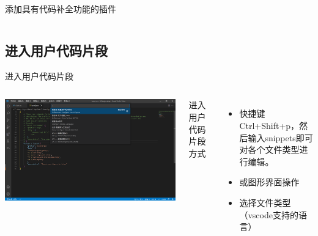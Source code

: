 \documentclass{beamer}
\begin{document}
\begin{frame}{添加具有代码补全功能的插件}
\begin{columns}
    \end{columns}
\end{frame}

\subsection{进入用户代码片段}
\begin{frame}{进入用户代码片段}
    \begin{columns}
        \begin{minipage}[c][\textheight][c]{\linewidth}
            \centering
            \includegraphics[scale=0.08]{pic/open.png}
        \end{minipage}
        进入用户代码片段方式
        \begin{itemize}
            \item 快捷键Ctrl+Shift+p，然后输入snippets即可对各个文件类型进行编辑。
            \item 或图形界面操作
            \item 选择文件类型（vscode支持的语言）
        \end{itemize}
    \end{columns}
\end{frame}
\end{document}
